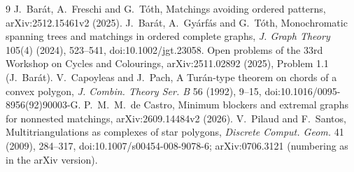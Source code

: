 \documentclass[11pt]{amsart}
\theoremstyle{definition}\newtheorem{problem}{Problem}
\theoremstyle{remark}\newtheorem*{remark}{Remark}
\begin{document}
\begin{thebibliography}{9}
 J.~Bar\'at, A.~Freschi and G.~T\'oth, Matchings avoiding ordered patterns, arXiv:2512.15461v2 (2025).
 J.~Bar\'at, A.~Gy\'arf\'as and G.~T\'oth, Monochromatic spanning trees and matchings in ordered
complete graphs, \emph{J. Graph Theory} 105(4) (2024), 523--541, doi:10.1002/jgt.23058.
 Open problems of the 33rd Workshop on Cycles and Colourings, arXiv:2511.02892 (2025), Problem 1.1
(J.~Bar\'at).
 V.~Capoyleas and J.~Pach, A Tur\'an-type theorem on chords of a convex polygon, \emph{J. Combin. Theory
Ser. B} 56 (1992), 9--15, doi:10.1016/0095-8956(92)90003-G.
 P.~M.~M.~de Castro, Minimum blockers and extremal graphs for nonnested matchings, arXiv:2609.14484v2
(2026).
 V.~Pilaud and F.~Santos, Multitriangulations as complexes of star polygons, \emph{Discrete Comput.
Geom.} 41 (2009), 284--317, doi:10.1007/s00454-008-9078-6; arXiv:0706.3121 (numbering as in the arXiv version).
\end{thebibliography}
\end{document}
